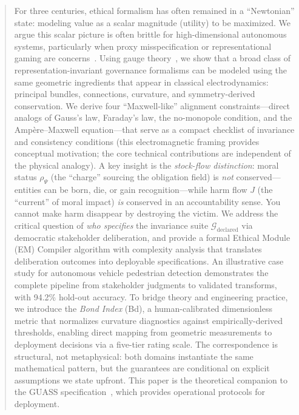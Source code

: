 \documentclass[12pt]{article}
\begin{document}
\begin{titlepage}
\begin{abstract}
For three centuries, ethical formalism has often remained in a ``Newtonian'' state: modeling
value as a scalar magnitude (utility) to be maximized. We argue this scalar picture is often
brittle for high-dimensional autonomous systems, particularly when proxy misspecification or
representational gaming are concerns~\cite{krakovna2020,hubinger2019}. Using gauge theory~\cite{nakahara2003,bleecker1981}, we show that a broad
class of representation-invariant governance formalisms can be modeled using the same geometric
ingredients that appear in classical electrodynamics: principal bundles, connections, curvature,
and symmetry-derived conservation. We derive four ``Maxwell-like'' alignment constraints---direct analogs of Gauss's law, Faraday's law, the no-monopole condition, and the Amp\`{e}re--Maxwell equation---that serve as a compact checklist of invariance and consistency conditions
(this electromagnetic framing provides conceptual motivation; the core technical contributions
are independent of the physical analogy). A key insight is the \emph{stock-flow distinction}: moral
status $\rho_\Psi$ (the ``charge'' sourcing the obligation field) is \emph{not} conserved---entities can be born,
die, or gain recognition---while harm flow $J$ (the ``current'' of moral impact) \emph{is} conserved in an
accountability sense. You cannot make harm disappear by destroying the victim. We address
the critical question of \emph{who specifies} the invariance suite $\mathcal{G}_{\text{declared}}$ via democratic stakeholder
deliberation, and provide a formal Ethical Module (EM) Compiler algorithm with complexity
analysis that translates deliberation outcomes into deployable specifications. An illustrative
case study for autonomous vehicle pedestrian detection demonstrates the complete pipeline from
stakeholder judgments to validated transforms, with 94.2\% hold-out accuracy. To bridge theory
and engineering practice, we introduce the \emph{Bond Index} (Bd), a human-calibrated dimensionless
metric that normalizes curvature diagnostics against empirically-derived thresholds, enabling
direct mapping from geometric measurements to deployment decisions via a five-tier rating
scale. The correspondence is structural, not metaphysical: both domains instantiate the same
mathematical pattern, but the guarantees are conditional on explicit assumptions we state
upfront. This paper is the theoretical companion to the GUASS specification~\cite{bond2025guass}, which provides
operational protocols for deployment.
\end{abstract}


\end{titlepage}
\end{document}
